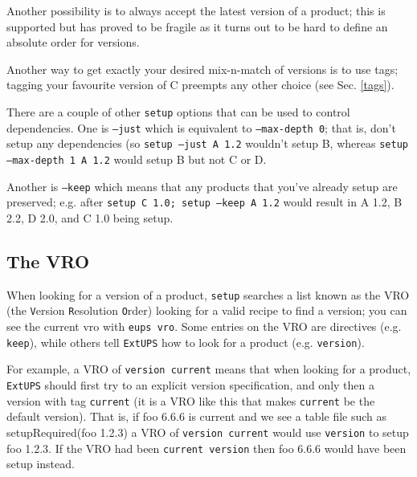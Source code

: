 \documentclass{article}
\newcommand{\code}[1]{\texttt{#1}}
\newcommand{\eups}{\code{ExtUPS}}
\let\overbatim=\verbatim
\let\oendverbatim=\endverbatim
\renewenvironment{verbatim}
{\center\minipage{16cm}\overbatim}
{\oendverbatim\endminipage\endcenter}
\begin{document}
Another possibility is to always accept the latest version of a product; this is
supported but has proved to be fragile as it turns out to be hard to define an absolute order for versions.

Another way to get exactly your desired mix-n-match of versions is to use tags; tagging your favourite
version of C preempts any other choice (see Sec. \ref{tags}).

There are a couple of other \code{setup} options that can be used to control dependencies.  One is
\code{--just} which is equivalent to \code{--max-depth 0}; that is, don't setup any dependencies (so
\code{setup --just A 1.2} wouldn't setup B, whereas
\code{setup --max-depth 1 A 1.2} would setup B but not C or D.

Another is \code{--keep} which means that any products that you've already setup are preserved; e.g.
after \code{setup C 1.0; setup --keep A 1.2} would
result in A 1.2, B 2.2, D 2.0, and C 1.0 being setup.

\subsection{The VRO}
\label{VRO}

When looking for a version of a product, \code{setup} searches a list known as the VRO (the \code{V}ersion
\code{R}esolution \code{O}rder) looking for a valid recipe to find a version; you can see the current vro with
\code{eups vro}.  Some entries on the VRO are directives (e.g.  \code{keep}), while others tell \eups{} how to
look for a product (e.g. \code{version}).

For example, a VRO of \code{version current} means that when looking for a product, \eups{} should
first try to an explicit version specification, and only then a version with tag \code{current} (it
is a VRO like this that makes \code{current} be the default version).  That is,
if foo 6.6.6 is current and we see a table file such as
\begin{verbatim}
setupRequired(foo 1.2.3)
\end{verbatim}
a VRO of \code{version current} would use  \code{version} to setup foo 1.2.3.
If the VRO had been \code{current version} then foo 6.6.6 would have been setup instead.
\end{document}
